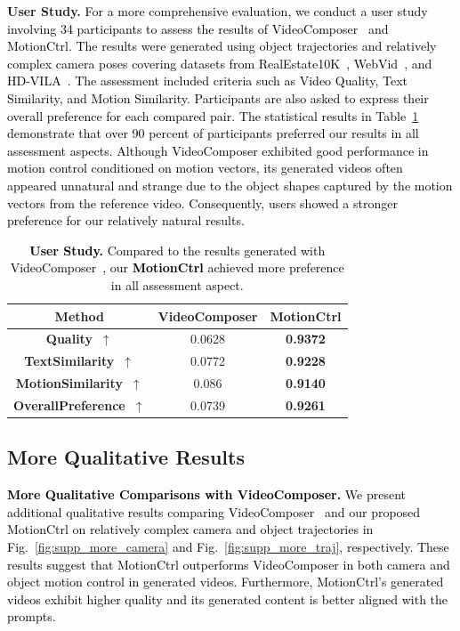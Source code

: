 \documentclass[sigconf]{acmart}
\begin{document}
\noindent\textbf{User Study.}\textcolor{black}{
For a more comprehensive evaluation, we conduct a user study involving 34 participants to assess the results of VideoComposer~\cite{wang2023videocomposer} and MotionCtrl. The results were generated using object trajectories and relatively complex camera poses covering datasets from RealEstate10K~\cite{zhou2018stereo}, WebVid~\cite{bain2021frozen}, and HD-VILA~\cite{xue2022advancing}. The assessment included criteria such as Video Quality, Text Similarity, and Motion Similarity. Participants are also asked to express their overall preference for each compared pair. The statistical results in Table~\ref{tab:user_study} demonstrate that over 90 percent of participants preferred our results in all assessment aspects. Although VideoComposer exhibited good performance in motion control conditioned on motion vectors, its generated videos often appeared unnatural and strange due to the object shapes captured by the motion vectors from the reference video. Consequently, users showed a stronger preference for our relatively natural results.
}

\begin{table}[th]
  \caption{\textcolor{black}{\textbf{User Study.} Compared to the results generated with VideoComposer~\cite{wang2023videocomposer}, our \textbf{MotionCtrl} achieved more preference in all assessment aspect.}}
  \centering
  \begin{tabular}{c|cc}
    \toprule
    Method                                  & VideoComposer & \textbf{MotionCtrl} \\
    \midrule
    \textbf{Quality~$\uparrow$}             & 0.0628  & \textbf{0.9372} \\
    \textbf{TextSimilarity~$\uparrow$}      & 0.0772  & \textbf{0.9228} \\
    \textbf{MotionSimilarity~$\uparrow$}    & 0.086   & \textbf{0.9140} \\
    \textbf{OverallPreference~$\uparrow$}   & 0.0739  & \textbf{0.9261} \\
    \bottomrule
  \end{tabular}
  \label{tab:user_study}
\end{table}

\subsection{More Qualitative Results}\textcolor{black}{
\noindent\textbf{More Qualitative Comparisons with VideoComposer.}
We present additional qualitative results comparing VideoComposer~\cite{wang2023videocomposer} and our proposed MotionCtrl on relatively complex camera and object trajectories in Fig.~\ref{fig:supp_more_camera} and Fig.~\ref{fig:supp_more_traj}, respectively. These results suggest that MotionCtrl outperforms VideoComposer in both camera and object motion control in generated videos. Furthermore, MotionCtrl's generated videos exhibit higher quality and its generated content is better aligned with the prompts.
}
\end{document}
